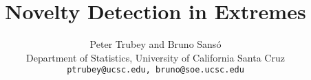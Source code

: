\documentclass[12pt]{article}
\title{Novelty Detection in Extremes}
\author{Peter Trubey and Bruno Sans\'o\\
Department of Statistics, University of California Santa Cruz\\
{\tt ptrubey@ucsc.edu, bruno@soe.ucsc.edu}}
\begin{document}
\maketitle
\thispagestyle{empty}
\begin{abstract}
  
\end{abstract}












\end{document}
